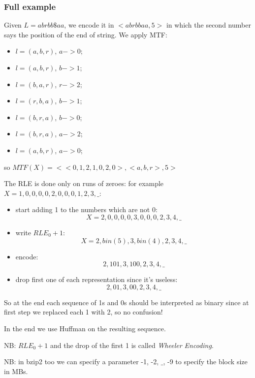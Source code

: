 \subsubsection{Full example}
Given $L = abrbb\$aa$, we encode it in $<abrbbaa, 5>$ in which the second number says the position of the end of string.
We apply MTF:
\begin{itemize}
    \item $l=(a, b, r)$, $a -> 0$;
    \item $l=(a, b, r)$, $b -> 1$;
    \item $l=(b, a, r)$, $r -> 2$;
    \item $l=(r, b, a)$, $b -> 1$;
    \item $l=(b, r, a)$, $b -> 0$;
    \item $l=(b, r, a)$, $a -> 2$;
    \item $l=(a, b, r)$, $a -> 0$;
\end{itemize}
so $MTF(X) = <<0, 1, 2, 1, 0, 2, 0>, <a, b, r>, 5> $

The RLE is done only on runs of zeroes: for example $X = 1, 0, 0, 0, 0, 2, 0, 0, 0, 1, 2, 3, \_$:
\begin{itemize}
    \item start adding 1 to the numbers which are not 0:
    $$
        X = 2, 0, 0, 0, 0, 3, 0, 0, 0, 2, 3, 4, \_
    $$
    \item write $RLE_0 +1$:
    $$
        X = 2, bin(5), 3, bin(4), 2, 3, 4, \_
    $$
    \item encode:
    $$
        2, 101, 3, 100, 2, 3, 4, \_
    $$
    \item drop first one of each representation since it's useless:
    $$
        2, 01, 3, 00, 2, 3, 4, \_
    $$
\end{itemize}
So at the end each sequence of 1s and 0s should be interpreted as binary since at first step we replaced each 1 with 2, so no confusion!

In the end we use Huffman on the resulting sequence.

NB: $RLE_0 + 1$ and the drop of the first 1 is called \emph{Wheeler Encoding}.

NB: in bzip2 too we can specify a parameter -1, -2, $\_$, -9 to specify the block size in MBs.



